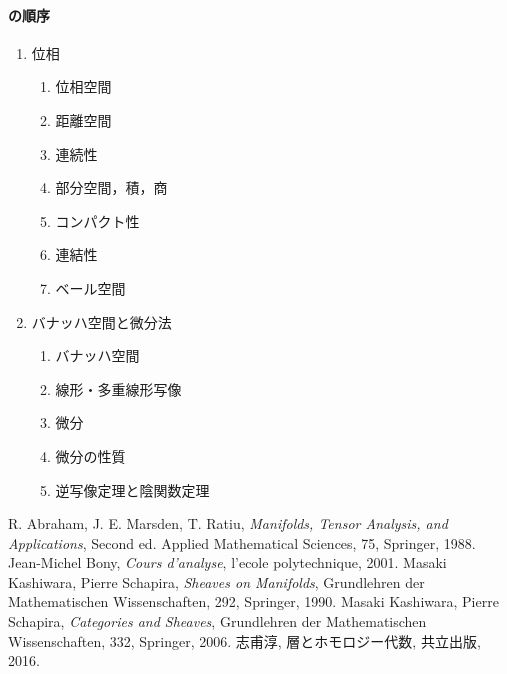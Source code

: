 \paragraph{\cite{AMR}の順序}
\begin{enumerate}
    \item 位相\begin{enumerate}[{1}.1]
        \item 位相空間
        \item 距離空間
        \item 連続性
        \item 部分空間，積，商
        \item コンパクト性
        \item 連結性
        \item ベール空間
    \end{enumerate}
    \item バナッハ空間と微分法
    \begin{enumerate}[{2}.1]
        \item バナッハ空間
        \item 線形・多重線形写像
        \item 微分
        \item 微分の性質
        \item 逆写像定理と陰関数定理
    \end{enumerate}
\end{enumerate}



\begin{thebibliography}{20} 
     R. Abraham, J. E. Marsden, T. Ratiu,
        \textit{Manifolds, Tensor Analysis, and Applications}, 
        Second ed. Applied Mathematical Sciences, 75, Springer, 1988.
     Jean-Michel Bony, 
        \textit{Cours d'analyse}, 
        l'ecole polytechnique, 2001.
     Masaki Kashiwara, Pierre Schapira, 
        \textit{Sheaves on Manifolds}, 
        Grundlehren der Mathematischen Wissenschaften, 292, Springer, 1990.
     Masaki Kashiwara, Pierre Schapira, 
        \textit{Categories and Sheaves}, 
        Grundlehren der Mathematischen Wissenschaften, 332, Springer, 2006.
     志甫淳, 層とホモロジー代数, 共立出版, 2016.
\end{thebibliography}




